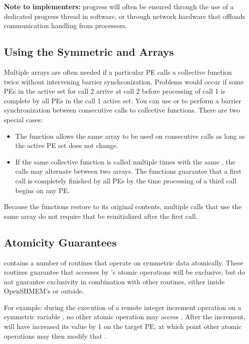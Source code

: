 \textbf{Note to implementers:} progress will often be ensured through
the use of a dedicated progress thread in software, or through
network hardware that offloads communication handling from processors.

\subsection{Using the Symmetric  and  Arrays}

Multiple  arrays are often needed if a particular \ac{PE} calls a \openshmem
collective  function twice without intervening barrier synchronization.
Problems would occur if some \ac{PE}s in the active set for call 2 arrive at
call 2 before processing of call 1 is complete by all \ac{PE}s in the call 1
active set.  You can use    or    to
perform  a  barrier  synchronization between consecutive calls to \openshmem
collective functions. There are two special cases:
\begin{itemize}
\item The  function allows the same  array to be used
          on consecutive calls as long as the active \ac{PE} set does not change.
\item  If the same collective function is called multiple times with the
          same \activeset, the calls may alternate between two  arrays.
          The \openshmem functions guarantee that a first call is completely finished by 
          all \ac{PE}s by the time processing of a third  call  begins  on
          any \ac{PE}.          
\end{itemize}
Because  the \openshmem functions restore  to its original contents,
multiple calls that use the same  array do not require that 
be reinitialized after the first call.

\subsection{Atomicity Guarantees}

\openshmem contains a number of routines that operate on symmetric data
atomically.  These routines guarantee that accesses by \openshmem's
atomic operations will be exclusive, but do not guarantee exclusivity
in combination with other routines, either inside OpenSHMEM's or
outside.

For example: during the execution of a remote integer increment
operation on a symmetric variable , no other \openshmem atomic
operation may access .  After the increment,  will have
increased its value by 1 on the target \ac{PE}, at which point other
atomic operations may then modify that .

